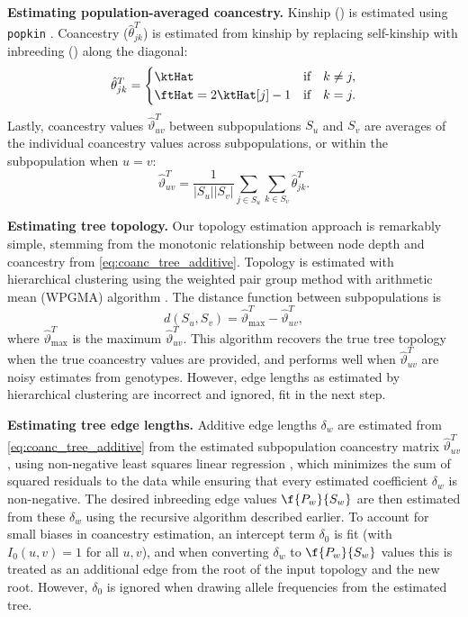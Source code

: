 \documentclass[11pt]{article}
\begin{document}
\textbf{Estimating population-averaged coancestry.}
Kinship (\ktHat) is estimated using \texttt{popkin} \citep{ochoa_estimating_2021}.
Coancestry ($\hat{\theta}_{jk}^T$) is estimated from kinship by replacing self-kinship with inbreeding (\ftHat) along the diagonal:
\begin{equation}
  \label{eq:kinship_to_coanc}
  \hat{\theta}_{jk}^T
  =
  \begin{cases}
    \ktHat & \text{if} \quad k \ne j, \\
    \ftHat = 2 \ktHat[j] - 1 & \text{if} \quad k = j.
  \end{cases}
\end{equation}
Lastly, coancestry values $\hat{\vartheta}_{uv}^T$ between subpopulations $S_u$ and $S_v$ are averages of the individual coancestry values across subpopulations, or within the subpopulation when $u=v$:
$$
\hat{\vartheta}_{uv}^T
=
\frac{1}{|S_u||S_v|} \sum_{j \in S_u} \sum_{k \in S_v} \hat{\theta}_{jk}^T
.
$$

\textbf{Estimating tree topology.}
Our topology estimation approach is remarkably simple, stemming from the monotonic relationship between node depth and coancestry from \cref{eq:coanc_tree_additive}.
Topology is estimated with hierarchical clustering using the weighted pair group method with arithmetic mean (WPGMA) algorithm \citep{sokal_statistical_1958}.
The distance function between subpopulations is
$$
d( S_u, S_v ) = \hat{\vartheta}_\text{max}^T - \hat{\vartheta}_{uv}^T,
$$
where $\hat{\vartheta}_\text{max}^T$ is the maximum $\hat{\vartheta}_{uv}^T$.
This algorithm recovers the true tree topology when the true coancestry values are provided, and performs well when $\hat{\vartheta}_{uv}^T$ are noisy estimates from genotypes.
However, edge lengths as estimated by hierarchical clustering are incorrect and ignored, fit in the next step.

\textbf{Estimating tree edge lengths.}
Additive edge lengths $\delta_w$ are estimated from \cref{eq:coanc_tree_additive} from the estimated subpopulation coancestry matrix $\hat{\vartheta}_{uv}^T$, using non-negative least squares linear regression \citep{lawson_solving_1974}, which minimizes the sum of squared residuals to the data while ensuring that every estimated coefficient $\delta_w$ is non-negative.
The desired inbreeding edge values $\f{P_w}{S_w}$ are then estimated from these $\delta_w$ using the recursive algorithm described earlier.
To account for small biases in coancestry estimation, an intercept term $\delta_0$ is fit (with $I_0(u,v) = 1$ for all $u,v$), and when converting $\delta_w$ to $\f{P_w}{S_w}$ values this is treated as an additional edge from the root of the input topology and the new root.
However, $\delta_0$ is ignored when drawing allele frequencies from the estimated tree.
\end{document}
